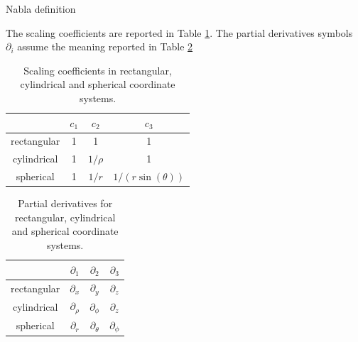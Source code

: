 \documentclass[handout,10pt]{beamer}
\begin{document}
\begin{frame}[shrink=00]{Nabla definition}

The scaling coefficients are reported in  Table \ref{Ci_table}. The partial derivatives symbols $\partial_i$ assume the meaning reported in Table \ref{partiali_table}

\begin{table}[]
\centering
\caption{Scaling coefficients in rectangular, cylindrical and spherical coordinate systems. }
\label{Ci_table}
\begin{tabular}{| c | c | c | c | }
\hline
 & $c_1$ & $c_2$  & $c_3$  \\
\hline
rectangular & 1 & 1  &  1 \\ \hline
cylindrical &1 & $1/\rho$  &  1    \\ \hline
spherical & 1 & $1/r$  &  $1/(r \sin(\theta))$   \\ \hline
\end{tabular}
\end{table}

\begin{table}[]
\centering
\caption{Partial derivatives for rectangular, cylindrical and spherical coordinate systems. }
\label{partiali_table}
\begin{tabular}{| c | c | c | c | }
\hline
 & $\partial_1$ & $\partial_2$  & $\partial_3$  \\
\hline
rectangular & $\partial_x$ & $\partial_y$  & $\partial_z$ \\ \hline
cylindrical &$\partial_\rho$ & $\partial_\phi$  & $\partial_z$    \\ \hline
spherical & $\partial_r$ & $\partial_\theta$  & $\partial_\phi$   \\ \hline
\end{tabular}
\end{table}


\end{frame}
\end{document}
